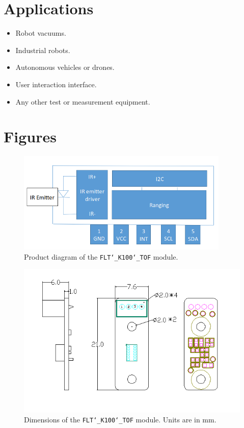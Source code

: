 \documentclass{scrreprt}
\newcommand{\modelno}{%
	\texttt{FLT\char`_K100\char`_TOF}
}
\begin{document}
\begin{CJK*}{UTF8}{gbsn}
\section{Applications}
\begin{itemize}
	\item Robot vacuums.
	\item Industrial robots.
	\item Autonomous vehicles or drones.
	\item User interaction interface.
	\item Any other test or measurement equipment.
\end{itemize}

\section{Figures}
\begin{figure}[H]
\center\includegraphics[width=0.9\textwidth]{schematic.png}
\caption{Product diagram of the \modelno module.}
\end{figure}

\begin{figure}[H]
\center\includegraphics[width=\textwidth]{schematic2.png}
\caption{Dimensions of the \modelno module. Units are in mm.}
\end{figure}


\end{CJK*}
\end{document}

